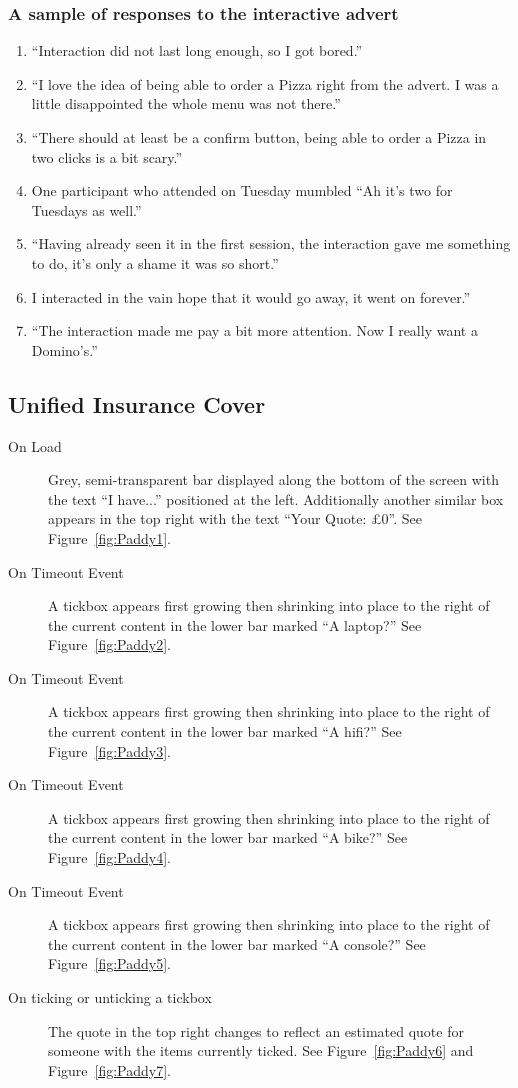 	\subsubsection*{A sample of responses to the interactive advert}
	\begin{enumerate}
		\item{``Interaction did not last long enough, so I got bored.''}
		\item{``I love the idea of being able to order a Pizza right from the advert. I was a little disappointed the whole menu was not there.''}
		\item{``There should at least be a confirm button, being able to order a Pizza in two clicks is a bit scary.''}
		\item{One participant who attended on Tuesday mumbled ``Ah it's two for Tuesdays as well.''}
		\item{``Having already seen it in the first session, the interaction gave me something to do, it's only a shame it was so short.''}
		\item{I interacted in the vain hope that it would go away, it went on forever.''}
		\item{``The interaction made me pay a bit more attention. Now I really want a Domino's.''}
	\end{enumerate}

\clearpage
\subsection{Unified Insurance Cover}
	\begin{description}
		\item[On Load]{Grey, semi-transparent bar displayed along the bottom of the screen with the text ``I have...'' positioned at the left. Additionally another similar box appears in the top right with the text ``Your Quote: £0''. See Figure~\ref{fig:Paddy1}.}
		\item[On Timeout Event]{A tickbox appears first growing then shrinking into place to the right of the current content in the lower bar marked ``A laptop?'' See Figure~\ref{fig:Paddy2}.}
		\item[On Timeout Event]{A tickbox appears first growing then shrinking into place to the right of the current content in the lower bar marked ``A hifi?'' See Figure~\ref{fig:Paddy3}.}
		\item[On Timeout Event]{A tickbox appears first growing then shrinking into place to the right of the current content in the lower bar marked ``A bike?'' See Figure~\ref{fig:Paddy4}.}
		\item[On Timeout Event]{A tickbox appears first growing then shrinking into place to the right of the current content in the lower bar marked ``A console?'' See Figure~\ref{fig:Paddy5}.}
		\item[On ticking or unticking a tickbox]{The quote in the top right changes to reflect an estimated quote for someone with the items currently ticked. See Figure~\ref{fig:Paddy6} and Figure~\ref{fig:Paddy7}.}
	\end{description}


